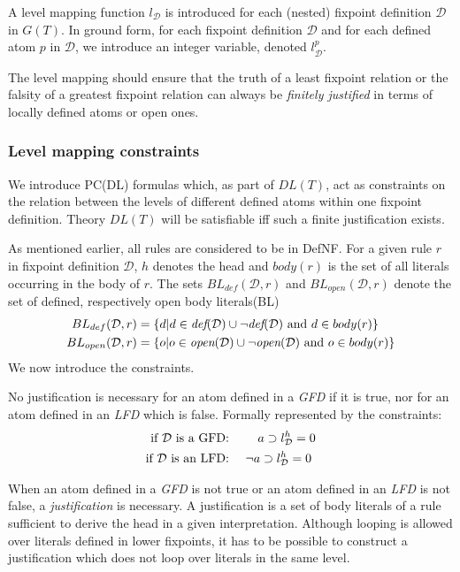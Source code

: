 \documentclass{tlp}
\newcommand{\lev}[2]{\ensuremath{l_{#1}^{#2}}}
\newcommand{\openset}[2]{BL_{open}(#1, #2)}
\newcommand{\defset}[2]{BL_{def}(#1, #2)}
\newcommand{\gt}{G(T)}
\newcommand{\dlt}{DL(T)}
\newcommand{\FD}{\ensuremath{\mathcal{D}}\xspace}
\newcommand{\defp}[1]{\ensuremath{\mbox{\it def}(#1)}\xspace}
\newcommand{\openp}[1]{\ensuremath{\mbox{\it open}(#1)}\xspace}
\begin{document}
A level mapping function $l_{\FD}$ is introduced for each (nested) fixpoint definition $\FD$ in $\gt$. In ground form, for each fixpoint definition $\FD$ and for each defined atom $p$ in $\FD$, we introduce an integer variable, denoted $\lev{\FD}{p}$.

The level mapping should ensure that the truth of a least fixpoint relation or the falsity of a greatest fixpoint relation can always be \emph{finitely justified} in terms of locally defined atoms or open ones.

\subsubsection{Level mapping constraints}
We introduce PC(DL) formulas which, as part of $\dlt$, act as constraints on the relation between the levels of different defined atoms within one fixpoint definition. Theory $\dlt$ will be satisfiable iff such a finite justification exists.

As mentioned earlier, all rules are considered to be in DefNF. For a given rule $r$ in fixpoint definition $\FD$, $h$ denotes the head and $body(r)$ is the set of all literals occurring in the body of $r$. The sets $\defset{\FD}{r}$ and $\openset{\FD}{r}$ denote the set of defined, respectively open body literals(BL)
\begin{align}
\defset{\FD}{r} &= \{d | d \in \defp{\FD} \cup \lnot \defp{\FD} \ \text{and} \ d \in body(r)\} \\
\openset{\FD}{r} &= \{o | o \in \openp{\FD} \cup \lnot \openp{\FD} \ \text{and} \ o \in body(r)\}
\end{align}
We now introduce the constraints.

No justification is necessary for an atom defined in a {\em GFD} if it is true, nor for an atom defined in an {\em LFD} which is false. Formally represented by the constraints:
\begin{align}
	\text{if \FD is a GFD: }&\qquad a \supset \lev{\FD}{h}=0\\
	\text{if \FD is an LFD: }& \quad \lnot a \supset \lev{\FD}{h}=0
\end{align}

When an atom defined in a {\em GFD} is not true or an atom defined in an {\em LFD} is not false, a \emph{justification} is necessary. A justification is a set of body literals of a rule sufficient to derive the head in a given interpretation. Although looping is allowed over literals defined in lower fixpoints, it has to be possible to construct a justification which does not loop over literals in the same level.
\end{document}
